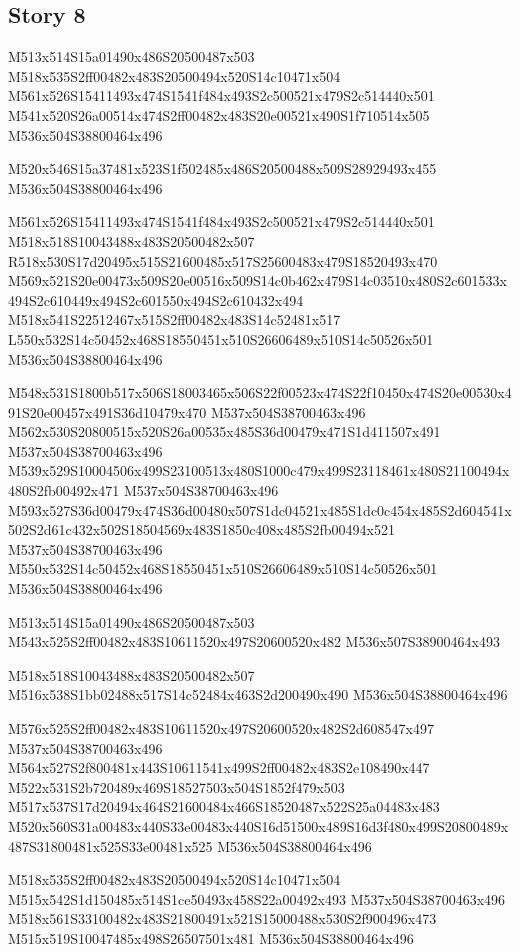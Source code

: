 \documentclass{article}
\begin{document}
\subsection{Story 8}

\begin{multicols}{5}
\begin{center}
M513x514S15a01490x486S20500487x503 %
M518x535S2ff00482x483S20500494x520S14c10471x504 %
M561x526S15411493x474S1541f484x493S2c500521x479S2c514440x501 %
M541x520S26a00514x474S2ff00482x483S20e00521x490S1f710514x505 %
M536x504S38800464x496 %

M520x546S15a37481x523S1f502485x486S20500488x509S28929493x455 %
M536x504S38800464x496 %

M561x526S15411493x474S1541f484x493S2c500521x479S2c514440x501 %
M518x518S10043488x483S20500482x507 %
R518x530S17d20495x515S21600485x517S25600483x479S18520493x470 %
M569x521S20e00473x509S20e00516x509S14c0b462x479S14c03510x480S2c601533x494S2c610449x494S2c601550x494S2c610432x494 %
M518x541S22512467x515S2ff00482x483S14c52481x517 %
L550x532S14c50452x468S18550451x510S26606489x510S14c50526x501 %
M536x504S38800464x496 %

M548x531S1800b517x506S18003465x506S22f00523x474S22f10450x474S20e00530x491S20e00457x491S36d10479x470 %
M537x504S38700463x496 %
M562x530S20800515x520S26a00535x485S36d00479x471S1d411507x491 %
M537x504S38700463x496 %
M539x529S10004506x499S23100513x480S1000c479x499S23118461x480S21100494x480S2fb00492x471 %
M537x504S38700463x496 %
M593x527S36d00479x474S36d00480x507S1dc04521x485S1dc0c454x485S2d604541x502S2d61c432x502S18504569x483S1850c408x485S2fb00494x521 %
M537x504S38700463x496 %
M550x532S14c50452x468S18550451x510S26606489x510S14c50526x501 %
M536x504S38800464x496 %

M513x514S15a01490x486S20500487x503 %
M543x525S2ff00482x483S10611520x497S20600520x482 %
M536x507S38900464x493 %

M518x518S10043488x483S20500482x507 %
M516x538S1bb02488x517S14c52484x463S2d200490x490 %
M536x504S38800464x496 %

M576x525S2ff00482x483S10611520x497S20600520x482S2d608547x497 %
M537x504S38700463x496 %
M564x527S2f800481x443S10611541x499S2ff00482x483S2e108490x447 %
M522x531S2b720489x469S18527503x504S1852f479x503 %
M517x537S17d20494x464S21600484x466S18520487x522S25a04483x483 %
M520x560S31a00483x440S33e00483x440S16d51500x489S16d3f480x499S20800489x487S31800481x525S33e00481x525 %
M536x504S38800464x496 %

M518x535S2ff00482x483S20500494x520S14c10471x504 %
M515x542S1d150485x514S1ce50493x458S22a00492x493 %
M537x504S38700463x496 %
M518x561S33100482x483S21800491x521S15000488x530S2f900496x473 %
M515x519S10047485x498S26507501x481 %
M536x504S38800464x496 %

\end{center}
\end{multicols}
\end{document}
